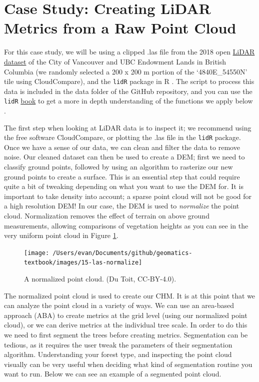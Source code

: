 \documentclass[
]{book}
\begin{document}
\hypertarget{case-study-creating-lidar-metrics-from-a-raw-point-cloud}{%
\section{Case Study: Creating LiDAR Metrics from a Raw Point Cloud}\label{case-study-creating-lidar-metrics-from-a-raw-point-cloud}}

For this case study, we will be using a clipped .las file from the 2018 open \href{https://opendata.vancouver.ca/explore/dataset/lidar-2018/information/}{LiDAR dataset} of the City of Vancouver and UBC Endowment Lands in British Columbia (we randomly selected a 200 x 200 m portion of the `4840E\_54550N' tile using CloudCompare), and the \texttt{lidR} package in R \citep[\citet{Roussel2020}]{CityofVancouver}. The script to process this data is included in the data folder of the GitHub repository, and you can use the \texttt{lidR} \href{https://jean-romain.github.io/lidRbook/}{book} to get a more in depth understanding of the functions we apply below \citep{Roussel2021}.

The first step when looking at LiDAR data is to inspect it; we recommend using the free software CloudCompare, or plotting the .las file in the \texttt{lidR} package. Once we have a sense of our data, we can clean and filter the data to remove noise. Our cleaned dataset can then be used to create a DEM; first we need to classify ground points, followed by using an algorithm to rasterize our new ground points to create a surface. This is an essential step that could require quite a bit of tweaking depending on what you want to use the DEM for. It is important to take density into account; a sparse point cloud will not be good for a high resolution DEM! In our case, the DEM is used to \emph{normalize} the point cloud. Normalization removes the effect of terrain on above ground measurements, allowing comparisons of vegetation heights as you can see in the very uniform point cloud in Figure \ref{fig:15-las-normalize}.

\begin{figure}
\texttt{[image: /Users/evan/Documents/github/geomatics-textbook/images/15-las-normalize]} \caption{A normalized point cloud. (Du Toit, CC-BY-4.0).}\label{fig:15-las-normalize}
\end{figure}

The normalized point cloud is used to create our CHM. It is at this point that we can analyze the point cloud in a variety of ways. We can use an area-based approach (ABA) to create metrics at the grid level (using our normalized point cloud), or we can derive metrics at the individual tree scale. In order to do this we need to first segment the trees before creating metrics. Segmentation can be tedious, as it requires the user tweak the parameters of their segmentation algorithm. Understanding your forest type, and inspecting the point cloud visually can be very useful when deciding what kind of segmentation routine you want to run. Below we can see an example of a segmented point cloud.
\end{document}
